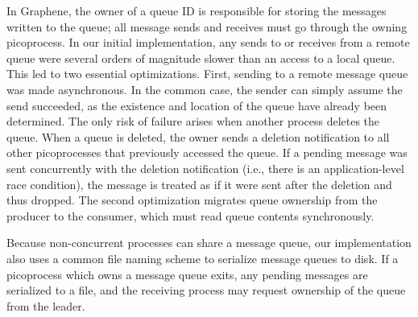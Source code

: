 \vspace{5pt}
 In Graphene, the owner of a queue ID is responsible for 
storing the messages written to the queue; all message sends and receives must 
go through the owning picoprocess.  
In our initial implementation, any sends to or receives from a remote queue were several
orders of magnitude slower than an access to a local queue.
This led to two essential optimizations.  
First, sending to a remote
message queue was made asynchronous.  In the common case, the sender can simply assume 
the send succeeded, as the existence and location of the queue have already been determined.
The only risk of failure arises when another process deletes the queue.
When a queue is deleted, the owner sends a deletion notification to all other picoprocesses
that previously accessed the queue.
If a pending message was sent concurrently with the deletion notification 
(i.e., there is an application-level race condition), 
the message is treated as if it were sent after the deletion and thus dropped.
The second optimization migrates queue ownership from the producer to the consumer,
which must read queue contents synchronously.


Because non-concurrent processes can share a message queue,
our implementation also uses a common file naming scheme to serialize message queues to disk.
If a picoprocess which owns a message queue exits, 
any pending messages are serialized to a file,
and the receiving process may request ownership of the queue from the leader.



